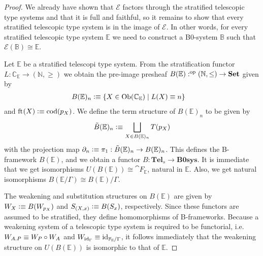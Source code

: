 \begin{proof}
We already have shown that $\mathcal{E}$ factors through the stratified
telescopic type systems and that it is full and faithful, so it remains
to show that every stratified telescopic type system is in the image of $\mathcal{E}$. In
other words, for every stratified telescopic type system $\mathbb{E}$ we need to construct
a B0-system $\mathbb{B}$ such that $\mathcal{E}(\mathbb{B})\cong\mathbb{E}$. 

Let $\mathbb{E}$ be a stratified telescopi type system. From the stratification functor
$L:\mathbb{C}_{\mathbb{E}}\to (\mathbb{N},\geq)$ we obtain the pre-image
presheaf $B(\mathbb{E}):\op{(\mathbb{N},\leq)}\to\mathbf{Set}$ given by
\begin{align*}
B(\mathbb{E})_n & \defeq \{X\in\mathrm{Ob}(\mathbb{C}_{\mathbb{E}})\mid L(X)\jdeq n\}
\end{align*}
and $\eft(X)\defeq\mathrm{cod}(p_X)$. We define the term structure of $B(\mathbb{E})_n$
to be given by
\begin{equation*}
\tilde{B}(\mathbb{E})_n \defeq \bigsqcup_{X\in B(\mathbb{E})_n} T(p_X)
\end{equation*}
with the projection map $\ebd[n]\defeq\pi_1:\tilde{B}(\mathbb{E})_n\to B(\mathbb{E})_n$.
This defines the B-framework $B(\mathbb{E})$, and we obtain a functor
$B:\mathbf{Tel}_s\to\mathbf{B0sys}$. It is immediate that we get isomorphisms
$U(B(\mathbb{E}))\cong\cat{F}_{\mathbb{E}}$, natural in $\mathbb{E}$. Also, we
get natural isomorphisms $B(\mathbb{E}/\Gamma)\cong B(\mathbb{E})/\Gamma$. 

The weakening and substitution structures on
$B(\mathbb{E})$ are given by $W_X\defeq B(W_{p_X})$ and $S_{(X,x)}\defeq B(S_x)$,
respectively. Since these functors are assumed to be stratified, they define
homomorphisms of B-frameworks. Because a weakening system of a telescopic type system is
required to be functorial, i.e.~$W_{\ctxext{A}{P}}\jdeq W_P\circ W_A$ and
$W_{\catid{\Gamma}}\jdeq\catid{\cat{F}_{\mathbb{E}}/\Gamma}$, it follows
immediately that the weakening structure on $U(B(\mathbb{E}))$ is isomorphic to
that of $\mathbb{E}$. 
\end{proof}

